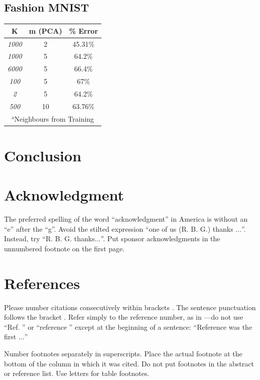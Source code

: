 \documentclass[conference]{IEEEtran}
\begin{document}
\subsection{Fashion MNIST}
\begin{table}[htbp]
\begin{center}
\begin{tabular}{|c|c|c|}
\hline
\textbf{K}&\textbf{m (PCA)}&\textbf{\% Error} \\
\hline
\textit{1000} &2&45.31\%\\
\hline
\textit{1000}&5&64.2\%\\
\hline
\textit{6000}&5&66.4\%\\
\hline
\textit{100}&5&67\%\\
\hline
\textit{2}&5&64.2\%\\
\hline
\textit{500}&10&63.76\%\\
\hline
\multicolumn{4}{s}{$^{\mathrm{a}}$Neighbours from Training }
\end{tabular}
\label{tab1}
\end{center}
\end{table}

\section{Conclusion}

\section*{Acknowledgment}

The preferred spelling of the word ``acknowledgment'' in America is without 
an ``e'' after the ``g''. Avoid the stilted expression ``one of us (R. B. 
G.) thanks $\ldots$''. Instead, try ``R. B. G. thanks$\ldots$''. Put sponsor 
acknowledgments in the unnumbered footnote on the first page.

\section*{References}

Please number citations consecutively within brackets \cite{b1}. The 
sentence punctuation follows the bracket \cite{b2}. Refer simply to the reference 
number, as in \cite{b3}---do not use ``Ref. \cite{b3}'' or ``reference \cite{b3}'' except at 
the beginning of a sentence: ``Reference \cite{b3} was the first $\ldots$''

Number footnotes separately in superscripts. Place the actual footnote at 
the bottom of the column in which it was cited. Do not put footnotes in the 
abstract or reference list. Use letters for table footnotes.
\end{document}
